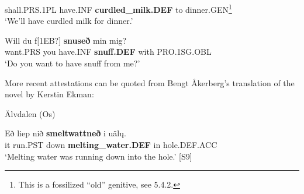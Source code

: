 shall.PRS.1PL  have.INF  \textbf{curdled\_milk.DEF} to  dinner.GEN\footnote{ This is a fossilized “old” genitive, see 5.4.2.}  \\

\glt ‘We’ll have curdled milk for dinner.’

\z

\item 


 \ea\label{}
\gll Will  du  f[1EB?]  \textbf{snuseð} min  mig?\\


want.PRS  you  have.INF  \textbf{snuff.DEF} with  PRO.1SG.OBL\\

\glt  ‘Do you want to have snuff from me?’

\z

More recent attestations can be quoted from Bengt Åkerberg’s translation of the novel  by Kerstin Ekman:


\item 

\label{bkm:Ref113183734}Älvdalen (Os) 



\item 


 \ea\label{}
\gll Eð  liep  nið  \textbf{smeltwattneð} i  uäl\k{u}.  \\


it  run.PST  down  \textbf{melting\_water.DEF} in  hole.DEF.ACC  \\

\glt ‘Melting water was running down into the hole.’ [S9]

\z

